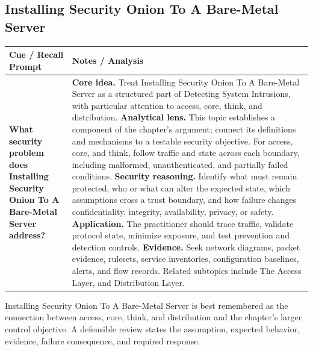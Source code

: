 \documentclass[11pt]{article}
\newcommand{\CornellHeader}{%
\rowcolor{Navy}\color{white}\bfseries Cue / Recall Prompt & \color{white}\bfseries Notes / Analysis\\\hline}
\newcommand{\CornellRow}[2]{%
\cellcolor{CueGray}\RaggedRight\textbf{#1} & \RaggedRight #2\\\hline}
\begin{document}
\subsection*{Installing Security Onion To A Bare-Metal Server}
\begin{longtable}{>{\RaggedRight\arraybackslash}p{}|>{\RaggedRight\arraybackslash}p{}}
\CornellHeader
\CornellRow{What security problem does Installing Security Onion To A Bare-Metal Server address?}{\textbf{Core idea.} Treat Installing Security Onion To A Bare-Metal Server as a structured part of Detecting System Intrusions, with particular attention to access, core, think, and distribution. \textbf{Analytical lens.} This topic establishes a component of the chapter's argument; connect its definitions and mechanisms to a testable security objective. For access, core, and think, follow traffic and state across each boundary, including malformed, unauthenticated, and partially failed conditions. \textbf{Security reasoning.} Identify what must remain protected, who or what can alter the expected state, which assumptions cross a trust boundary, and how failure changes confidentiality, integrity, availability, privacy, or safety. \textbf{Application.} The practitioner should trace traffic, validate protocol state, minimize exposure, and test prevention and detection controls. \textbf{Evidence.} Seek network diagrams, packet evidence, rulesets, service inventories, configuration baselines, alerts, and flow records. Related subtopics include The Access Layer, and Distribution Layer.}
\end{longtable}
\begin{topicsummary}
Installing Security Onion To A Bare-Metal Server is best remembered as the connection between access, core, think, and distribution and the chapter's larger control objective. A defensible review states the assumption, expected behavior, evidence, failure consequence, and required response.
\end{topicsummary}
\end{document}
